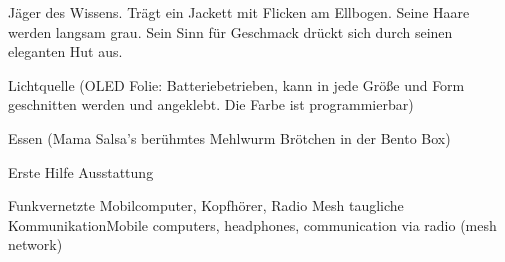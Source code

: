 \begin{npcBox}[title=Books]
    \begin{consequences}
    \item {}
    \item {}
    \item {}
    \end{consequences}

    \begin{npcDescription}
    Jäger des Wissens. Trägt ein Jackett mit Flicken am Ellbogen. Seine Haare werden langsam grau. Sein Sinn für Geschmack drückt sich durch seinen eleganten Hut aus.
    \end{npcDescription}


    \begin{equipment}
    \item Lichtquelle (OLED Folie: Batteriebetrieben, kann in jede Größe und Form geschnitten werden und angeklebt. Die Farbe ist programmierbar)
    \item Essen (Mama Salsa's berühmtes Mehlwurm Brötchen in der Bento Box)
    \item Erste Hilfe Ausstattung
    \item Funkvernetzte Mobilcomputer, Kopfhörer, Radio Mesh taugliche KommunikationMobile computers, headphones, communication via radio (mesh network)
    \end{equipment}

\end{npcBox}

